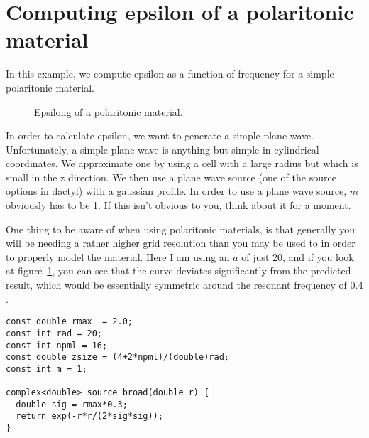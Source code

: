 \begin{comment}
#include <stdio.h>
#include <stdlib.h>
#include <signal.h>

#include "dactyl.h"

const char header[] = "# Grace project file
#
@page size 792, 612
@page scroll 5%
@page inout 5%
@default symbol size 0.330000\n
@    s0 line color 1
@    s0 symbol color 1
@    s0 legend  \"\\x\\e\\s1\\N\"
@    s1 line color 2
@    s1 symbol color 2
@    s1 legend  \"\\x\\e\\s2\\N\"
";
\end{comment}

\section{Computing epsilon of a polaritonic material}

In this example, we compute epsilon as a function of frequency for a simple
polaritonic material.

\begin{figure}
\label{epsilon_polariton}
\caption{Epsilong of a polaritonic material.}
\end{figure}

In order to calculate epsilon, we want to generate a simple plane wave.
Unfortunately, a simple plane wave is anything but simple in cylindrical
coordinates.  We approximate one by using a cell with a large radius but
which is small in the z direction.  We then use a plane wave source (one of
the source options in dactyl) with a gaussian profile.  In order to use a
plane wave source, $m$ obviously has to be 1.  If this isn't obvious to
you, think about it for a moment.

One thing to be aware of when using polaritonic materials, is that
generally you will be needing a rather higher grid resolution than you may
be used to in order to properly model the material.  Here I am using an $a$
of just 20, and if you look at figure~\ref{epsilon_polariton}, you can see
that the curve deviates significantly from the predicted result, which
would be essentially symmetric around the resonant frequency of $0.4$.

\begin{verbatim}
const double rmax  = 2.0;
const int rad = 20;
const int npml = 16;
const double zsize = (4+2*npml)/(double)rad;
const int m = 1;

complex<double> source_broad(double r) {
  double sig = rmax*0.3;
  return exp(-r*r/(2*sig*sig));
}
\end{verbatim}

